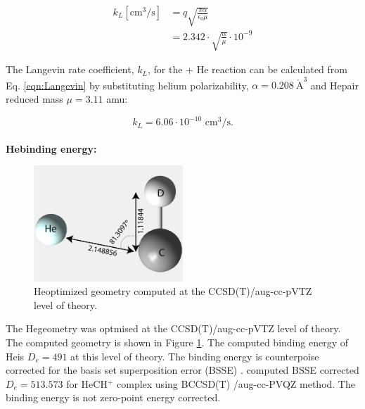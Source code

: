 \begin{equation}
    \begin{split}
        k_L [\text{cm}^3 / \text{s}] & = q \sqrt{\frac{\pi \alpha}{\epsilon _0 \mu}} \\
        &= 2.342 \cdot \sqrt{ \frac{\alpha}{\mu}} \cdot 10^{-9} 
   \end{split}
   \label{eqn:Langevin}
\end{equation}


The Langevin rate coefficient, $k_L$, for the \CD + He reaction can be calculated from Eq. \ref{eqn:Langevin} by substituting helium polarizability, $\alpha=0.208\  \mathring{\text{A}}^3$ \cite{olney_absolute_1997} and He\CD pair reduced mass $\mu=3.11$ amu:

\begin{equation}
        k_L = 6.06 \cdot 10^{-10} \text{ cm}^3 / \text{s}.
   \label{eqn:Langevin-CD+}
\end{equation}
\\
\textbf{He\CD binding energy:}\label{discussions:binding-energy:CD+}\\

\begin{figure}[!htb]
    \centering
    \includegraphics[width=0.5\textwidth]{figures/measurements/kinetics/HeCD+_geometry.pdf}
    \caption{He\CD optimized geometry computed at the CCSD(T)/aug-cc-pVTZ level of theory.}
    \label{fig:HeCD_geometry}
\end{figure}

The He\CD geometry was optmised at the CCSD(T)/aug-cc-pVTZ level of theory. The computed geometry is shown in Figure \ref{fig:HeCD_geometry}.
The computed binding energy of He\CD is $D_e=491$ \wnn at this level of theory. The binding energy is counterpoise corrected for the basis set superposition error (BSSE) \cite{boys_calculation_1970}.
\citet{stoecklin_vibrational_2008} computed BSSE corrected $D_e=513.573$ \wnn for HeCH$^+$ complex using BCCSD(T) /aug-cc-PVQZ method.
The binding energy is not zero-point energy corrected.

